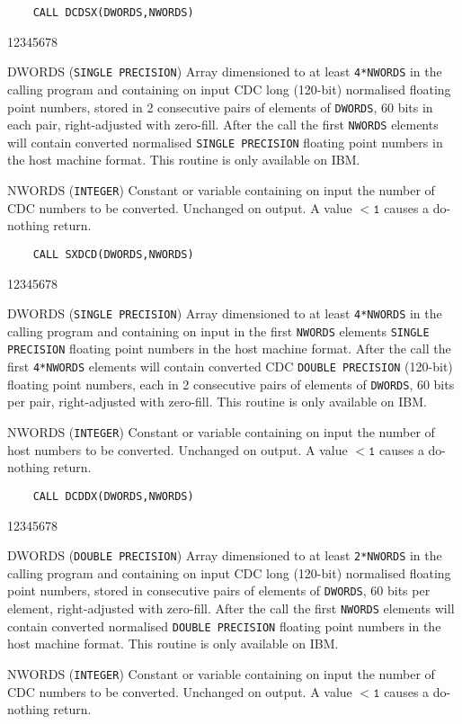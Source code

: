\begin{verbatim}
    CALL DCDSX(DWORDS,NWORDS)
\end{verbatim}
\begin{DLtt}{12345678}
\item[DWORDS] ({\tt SINGLE PRECISION}) Array dimensioned to at
least {\tt 4*NWORDS} in the calling program and containing on input CDC
long (120-bit) normalised floating point numbers, stored in 2
consecutive pairs of elements of {\tt DWORDS}, 60 bits in each pair,
right-adjusted with zero-fill. After the call the first {\tt NWORDS}
elements will contain converted normalised {\tt SINGLE PRECISION}
floating point numbers in the host machine format. This routine is only
available on IBM.
\item[NWORDS] ({\tt INTEGER}) Constant or variable containing on input
the number of CDC numbers to be converted. Unchanged on output. A
value $\mathtt{< 1}$ causes a do-nothing return.
\end{DLtt}
\newpage
\begin{verbatim}
    CALL SXDCD(DWORDS,NWORDS)
\end{verbatim}
\begin{DLtt}{12345678}
\item[DWORDS] ({\tt SINGLE PRECISION}) Array dimensioned to at
least {\tt 4*NWORDS} in the calling program and containing on input
in the first {\tt NWORDS} elements {\tt SINGLE PRECISION} floating point
numbers in the host machine format. After the call the first
{\tt 4*NWORDS} elements will contain converted CDC
{\tt DOUBLE PRECISION} (120-bit) floating point numbers, each in 2
consecutive pairs of elements of {\tt DWORDS}, 60 bits per pair,
right-adjusted with zero-fill. This routine is only available on IBM.
\item[NWORDS] ({\tt INTEGER}) Constant or variable containing on input
the number of host numbers to be converted. Unchanged on output. A
value $\mathtt{< 1}$ causes a do-nothing return.
\end{DLtt}
\begin{verbatim}
    CALL DCDDX(DWORDS,NWORDS)
\end{verbatim}
\begin{DLtt}{12345678}
\item[DWORDS] ({\tt DOUBLE PRECISION}) Array dimensioned to at least
{\tt 2*NWORDS} in the calling program and containing on input CDC
long (120-bit) normalised floating point numbers, stored in consecutive
pairs of elements of {\tt DWORDS}, 60 bits per element, right-adjusted
with zero-fill. After the call the first {\tt NWORDS} elements will
contain converted normalised {\tt DOUBLE PRECISION} floating point
numbers in the host machine format. This routine is only available on
IBM.
\item[NWORDS] ({\tt INTEGER}) Constant or variable containing on input
the number of CDC numbers to be converted. Unchanged on output. A
value $\mathtt{< 1}$ causes a do-nothing return.
\end{DLtt}
